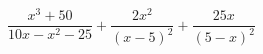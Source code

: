 \begin{ex}[type=expression]
	\begin{condition}
		\( \dfrac{x^3+50}{10x-x^2-25}+\dfrac{2x^2}{(x-5)^2}+\dfrac{25x}{(5-x)^2} \)
	\end{condition}
\end{ex}